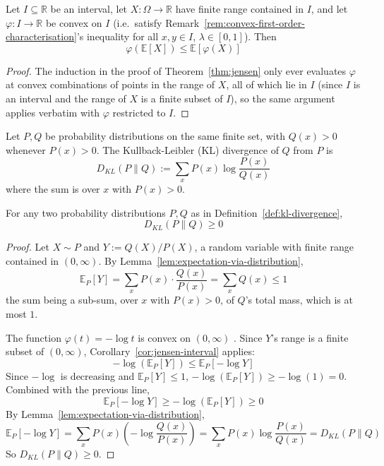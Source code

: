 		
		\begin{corollary}
			\label{cor:jensen-interval}
			Let $I\subseteq\mathbb{R}$ be an interval, let $X:\Omega\to\mathbb{R}$ have finite range contained in $I$, and let $\varphi:I\to\mathbb{R}$ be convex on $I$ (i.e.\ satisfy Remark~\ref{rem:convex-first-order-characterisation}'s inequality for all $x,y\in I$, $\lambda\in[0,1]$). Then
			\[
				\varphi(\mathbb{E}[X]) \le \mathbb{E}[\varphi(X)]
			\]
		\end{corollary}
		
		\begin{proof}
			The induction in the proof of Theorem~\ref{thm:jensen} only ever evaluates $\varphi$ at convex combinations of points in the range of $X$, all of which lie in $I$ (since $I$ is an interval and the range of $X$ is a finite subset of $I$), so the same argument applies verbatim with $\varphi$ restricted to $I$.
		\end{proof}
		
		\begin{definition}
			\label{def:kl-divergence}
			Let $P, Q$ be probability distributions on the same finite set, with $Q(x)>0$ whenever $P(x)>0$. The Kullback-Leibler (KL) divergence of $Q$ from $P$ is
			\[
				D_{KL}(P\|Q) := \sum_x P(x)\log\frac{P(x)}{Q(x)}
			\]
			where the sum is over $x$ with $P(x)>0$.
		\end{definition}
		
		\begin{proposition}
			\label{prop:kl-nonneg}
			For any two probability distributions $P,Q$ as in Definition~\ref{def:kl-divergence},
			\[
				D_{KL}(P\|Q) \ge 0
			\]
		\end{proposition}
		
		\begin{proof}
			Let $X\sim P$ and $Y := Q(X)/P(X)$, a random variable with finite range contained in $(0,\infty)$. By Lemma~\ref{lem:expectation-via-distribution},
			\[
				\mathbb{E}_P[Y] = \sum_x P(x)\cdot\frac{Q(x)}{P(x)} = \sum_x Q(x) \le 1
			\]
			the sum being a sub-sum, over $x$ with $P(x)>0$, of $Q$'s total mass, which is at most $1$.
			
			The function $\varphi(t)=-\log t$ is convex on $(0,\infty)$ \cite[\S3.1.5]{BoydVandenberghe2004}. Since $Y$'s range is a finite subset of $(0,\infty)$, Corollary~\ref{cor:jensen-interval} applies:
			\[
				-\log(\mathbb{E}_P[Y]) \le \mathbb{E}_P[-\log Y]
			\]
			Since $-\log$ is decreasing and $\mathbb{E}_P[Y]\le1$, $-\log(\mathbb{E}_P[Y]) \ge -\log(1) = 0$. Combined with the previous line,
			\[
				\mathbb{E}_P[-\log Y] \ge -\log(\mathbb{E}_P[Y]) \ge 0
			\]
			By Lemma~\ref{lem:expectation-via-distribution},
			\[
				\mathbb{E}_P[-\log Y] = \sum_x P(x)\left(-\log\frac{Q(x)}{P(x)}\right) = \sum_x P(x)\log\frac{P(x)}{Q(x)} = D_{KL}(P\|Q)
			\]
			So $D_{KL}(P\|Q) \ge 0$.
		\end{proof}
	
